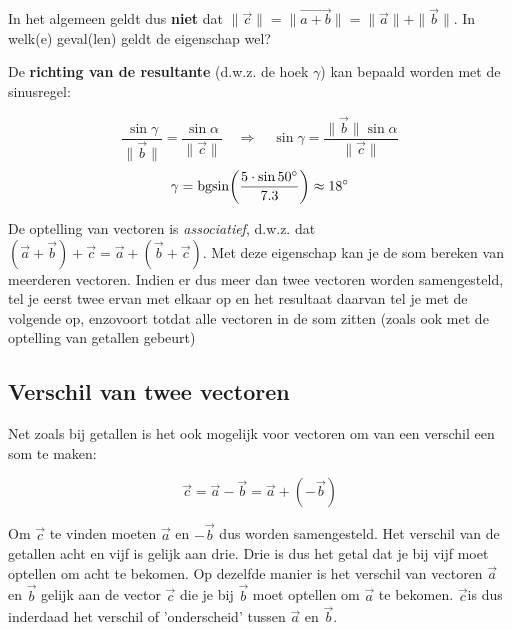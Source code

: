 \documentclass{ximera}
\begin{document}
\begin{remark}
In het algemeen geldt dus \textbf{niet} dat \(\|\vec{c}\| = \| \vec{a+b}\| = \|\vec{a}\| + \|\vec{b}\|\). In welk(e) geval(len) geldt de eigenschap wel? 
\end{remark}


De \textbf{richting van de resultante} (d.w.z. de hoek \(\gamma\)) kan bepaald worden met de sinusregel: 


\[
\frac{\sin\gamma}{\|\vec{b}\|} = \frac{\sin\alpha}{\|\vec{c}\|}
\quad\Longrightarrow\quad
\sin\gamma = \frac{\|\vec{b}\|\sin\alpha}{\|\vec{c}\|}
\]
\[
\gamma = \operatorname{bgsin}\!\left(\frac{5\cdot\sin 50^\circ}{7.3}\right) \approx 18^\circ
\]





De optelling van vectoren is \textit{associatief}, d.w.z. dat \((\vec{a} + \vec{b}) + \vec{c} = \vec{a} + (\vec{b} + \vec{c})\). 
Met deze eigenschap kan je de som bereken van meerderen vectoren. 
Indien er dus meer dan twee vectoren worden samengesteld, tel je eerst twee ervan met elkaar op en het resultaat daarvan tel je met de volgende op, enzovoort totdat alle vectoren in de som zitten (zoals ook met de optelling van getallen gebeurt)

\subsection*{Verschil van twee vectoren}

Net zoals bij getallen is het ook mogelijk voor vectoren om van een verschil een som te maken: 

\[
\vec{c} = \vec{a}-\vec{b} = \vec{a} + (-\vec{b})
\]

Om \(\vec{c}\) te vinden moeten \(\vec{a}\) en \(-\vec{b}\) dus worden samengesteld.
Het verschil van de getallen acht en vijf is gelijk aan drie. 
Drie is dus het getal dat je bij vijf moet optellen om acht te bekomen. 
Op dezelfde manier is het verschil van vectoren \(\vec{a}\) en \(\vec{b}\) gelijk aan de vector \(\vec{c}\) die je bij \(\vec{b}\) moet optellen om \(\vec{a}\) te bekomen.
 \(\vec{c}\)is dus inderdaad het verschil of 'onderscheid' tussen \(\vec{a}\) en \(\vec{b}\). 
\end{document}
